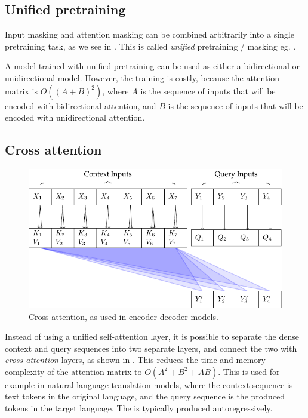 \subsection{Unified pretraining}
\label{ss:unified}

Input masking and attention masking can be combined arbitrarily into a single pretraining task, as we see in . This is called \textit{unified} pretraining / masking eg. \cite{unilm,t5}.

A model trained with unified pretraining can be used as either a bidirectional or unidirectional model. However, the training is costly, because the attention matrix is $O((A+B)^2)$, where $A$ is the sequence of inputs that will be encoded with bidirectional attention, and $B$ is the sequence of inputs that will be encoded with unidirectional attention.

\subsection{Cross attention}
\label{ss:cross-attn}

\begin{figure}
    \centering
    \includegraphics[]{figures/attn-2-cross.pdf}
    \caption[Cross-attention]{Cross-attention, as used in encoder-decoder models.}
    \hrulefill
    \label{fig:cross-attn}
\end{figure}

Instead of using a unified self-attention layer, it is possible to separate the dense context and query sequences into two separate layers, and connect the two with \textit{cross attention} layers, as shown in . This reduces the time and memory complexity of the attention matrix to $O(A^2 + B^2 + AB)$. This is used for example in natural language translation models, where the context sequence is text tokens in the original language, and the query sequence is the produced tokens in the target language. The  is typically produced autoregressively.


